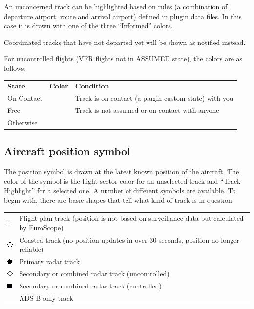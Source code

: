 \documentclass[11pt,a4paper]{memoir}
\newcommand{\colorref}[1]{\textit{\hyperref[#1]{\StrDel{#1}{color:}}}}
\begin{document}
An unconcerned track can be highlighted based on rules (a combination of departure airport, route and arrival airport) defined in plugin data files. In this case it is drawn with one of the three “Informed” colors.

Coordinated tracks that have not departed yet will be shown as notified instead.

For uncontrolled flights (VFR flights not in ASSUMED state), the colors are as follows:

\begin{tabular}{l l l}
\textbf{State}  & \textbf{Color}             & \textbf{Condition}\\
On Contact      & \colorref{color:Assumed}         & Track is on-contact (a plugin custom state) with you\\
Free            & \colorref{color:VFR}             & Track is not assumed or on-contact with anyone\\
Otherwise       & \colorref{color:Unconcerned}     &\\
\end{tabular}

\subsection{Aircraft position symbol}

The position symbol is drawn at the latest known position of the aircraft. The color of the symbol is the flight sector color for an unselected track and “Track Highlight” for a selected one. A number of different symbols are available. To begin with, there are basic shapes that tell what kind of track is in question:

\begin{tabular}{l l}
\includegraphics{img/rps_fpasd.png} & Flight plan track (position is not based on surveillance data but calculated by EuroScope)\\
\includegraphics{img/rps_coast.png} & Coasted track (no position updates in over 30 seconds, position no longer reliable)\\
\includegraphics{img/rps_psr.png} & Primary radar track\\
\includegraphics{img/rps_sec.png} & Secondary or combined radar track (uncontrolled)\\
\includegraphics{img/rps_psr+ssr.png} & Secondary or combined radar track (controlled)\\
 & ADS-B only track\\
\end{tabular}
\end{document}
